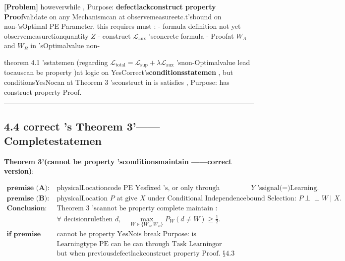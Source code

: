 \documentclass[
  12pt,
]{article}
\begin{document}
\textbf{{[}Problem{]}}
howeverwhile , Purpose: \textbf{defectlackconstruct property Proof}validate on any Mechanismcan at observemeasureetc.t'sbound on non-'sOptimal
PE Parameter. this requires must :  - formula definition not yet observemeasuretionquantity  \(Z\) - construct 
\(\mathcal{L}_{\text{aux}}\) 'sconcrete formula  - Proofat  \(W_A\) and  \(W_B\)
in 'sOptimalvalue non-

theorem  4.1 'sstatemen (regarding 
\(\mathcal{L}_{\text{total}} = \mathcal{L}_{\text{sup}} + \lambda \mathcal{L}_{\text{aux}}\)
'snon-Optimalvalue lead tocauscan be property )at logic on YesCorrect's\textbf{conditionsstatemen }, but conditionsYesNocan at 
Theorem 3 'sconstruct in is satisfies , Purpose: has construct property Proof. 

\begin{center}\rule{0.5\linewidth}{0.5pt}\end{center}

\subsection{4.4 correct 's Theorem
3'------Completestatemen }\label{ux4feeux6b63ux540eux7684-theorem-3ux5b8cux6574ux9648ux8ff0}

\textbf{Theorem 3'(cannot be property 'sconditionsmaintain ------correct version)}: 

\[\boxed{\begin{aligned}
\textbf{premise (A): } & \text{physicalLocationcode  PE Yesfixed 's, or only through independent title  } Y \text{ 'ssignal(=)Learning. } \\
\textbf{premise (B): } & \text{physicalLocation } P \text{ at give  } X \text{ under Conditional Independencebound Selection: } P \perp\!\!\!\perp W \mid X. \\
\textbf{Conclusion: } & \text{Theorem 3 'scannot be property complete maintain : } \\
& \forall \text{ decisionrulethen  } d, \quad \max_{W \in \{W_A, W_B\}} P_W(d \neq W) \geq \frac{1}{2}. \\
\textbf{if premise (A) does not hold: } & \text{cannot be property YesNois break Purpose: is a**amplifyProblem**. } \\
& \text{Learningtype  PE can be can through Task Learningor physicalone property constraintetc.Mechanismintervalworldbound , } \\
& \text{but when previousdefectlackconstruct property Proof.  §4.3 'sdiscusstheory. }
\end{aligned}}\]
\end{document}
